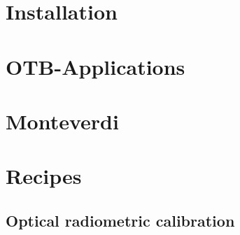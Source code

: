 \documentclass{InsightSoftwareGuide}
\begin{document}
\chapter{Installation}

\chapter{OTB-Applications}

\chapter{Monteverdi}

\chapter{Recipes}

\section{Optical radiometric calibration}
\end{document}
